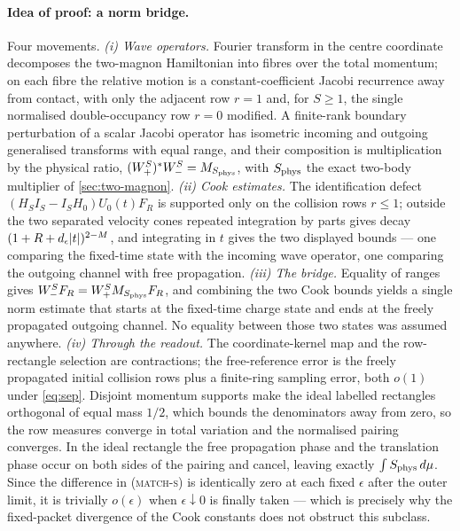 \paragraph{Idea of proof: a norm bridge.} Four movements. \emph{(i) Wave
operators.} Fourier transform in the centre coordinate decomposes the
two-magnon Hamiltonian into fibres over the total momentum; on each fibre the
relative motion is a constant-coefficient Jacobi recurrence away from contact,
with only the adjacent row $r=1$ and, for $S\ge1$, the single normalised
double-occupancy row $r=0$ modified. A finite-rank boundary perturbation of a
scalar Jacobi operator has isometric incoming and outgoing generalised
transforms with equal range, and their composition is multiplication by the
physical ratio, $(W_+^S)^*W_-^S=M_{S_{\rm phys}}$, with $S_{\rm phys}$ the
exact two-body multiplier of \cref{sec:two-magnon}. \emph{(ii) Cook
estimates.} The identification defect
$(H_SI_S-I_SH_0)U_0(t)F_R$ is supported only on the collision rows $r\le1$;
outside the two separated velocity cones repeated integration by parts gives
decay $(1+R+d_\epsilon\lvert t\rvert)^{2-M}$, and integrating in $t$ gives the two
displayed bounds --- one comparing the fixed-time state with the incoming wave
operator, one comparing the outgoing channel with free propagation.
\emph{(iii) The bridge.} Equality of ranges gives
$W_-^SF_R=W_+^SM_{S_{\rm phys}}F_R$, and combining the two Cook bounds yields
a single norm estimate that starts at the fixed-time charge state and ends at
the freely propagated outgoing channel. No equality between those two states
was assumed anywhere. \emph{(iv) Through the readout.} The coordinate-kernel
map and the row-rectangle selection are contractions; the free-reference error
is the freely propagated initial collision rows plus a finite-ring sampling
error, both $o(1)$ under \cref{eq:sep}. Disjoint momentum supports make the
ideal labelled rectangles orthogonal of equal mass $1/2$, which bounds the
denominators away from zero, so the row measures converge in total variation
and the normalised pairing converges. In the ideal rectangle the free
propagation phase and the translation phase occur on both sides of the pairing
and cancel, leaving exactly $\int S_{\rm phys}\,d\mu$. Since the difference in
\textsc{(match-s)} is identically zero at each fixed $\epsilon$ after the
outer limit, it is trivially $o(\epsilon)$ when $\epsilon\downarrow0$ is
finally taken --- which is precisely why the fixed-packet divergence of the
Cook constants does not obstruct this subclass.


